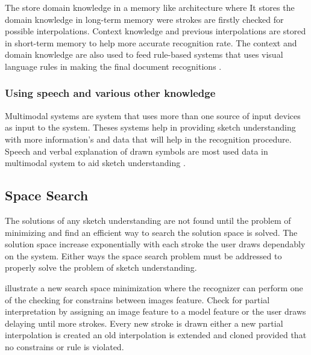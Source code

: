 The \cite{incrmentintention41} store domain knowledge in a memory like architecture where It stores the domain knowledge in long-term memory were strokes are firstly checked for possible interpolations. Context knowledge and previous interpolations are stored in short-term memory to help more accurate recognition rate. The context and domain knowledge are also used to feed rule-based systems that uses visual language rules in making the final document recognitions \cite{interpretationmechanical50}.


\subsubsection{Using speech and various other knowledge}
\label{sec:Usingspeechandvariousotherknowledge}

Multimodal systems are system that uses more than one source of input devices as input to the system. Theses systems help in providing sketch understanding with more information's and data that will help in the recognition procedure. Speech and verbal explanation of drawn symbols are most used data in multimodal system to aid sketch understanding \cite {cognitivesketch18,speechMulti27,computationalmodel16} .


\subsection{Space Search}
\label{sec:SpaceSearch}

The solutions of any sketch understanding are not found until the problem of minimizing and find an efficient way to search the solution space is solved.  The solution space increase exponentially with each stroke the user draws dependably on the system. Either ways the space search problem must be addressed to properly solve the problem of sketch understanding. 

\cite {EfficientAbstract39}  illustrate a new search space minimization where the recognizer can perform one of the checking for constrains between images feature. Check for partial interpretation by assigning an image feature to a model feature or the user draws delaying until more strokes. Every new stroke is drawn either a new partial interpolation is created an old interpolation is extended and cloned provided that no constrains or rule is violated.


